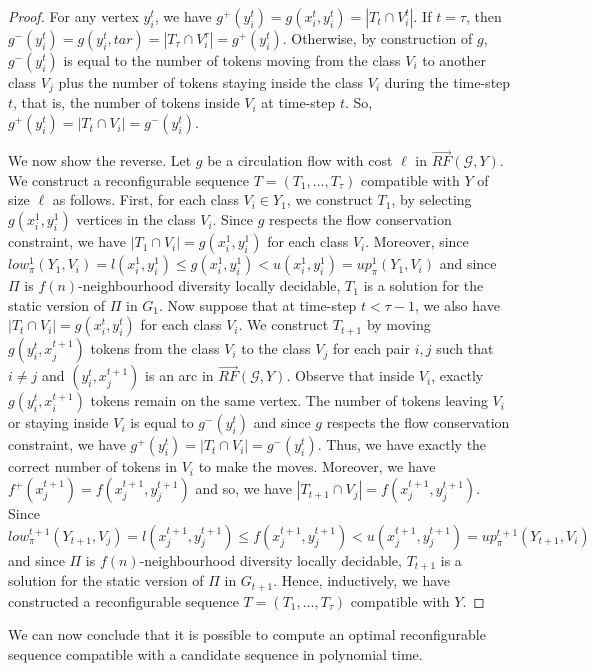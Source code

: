 \begin{proof}
    For any vertex $y^t_i$, we have $g^+(y^t_i) = g(x^t_i,y^t_i) = |T_t \cap V^t_i|$. If $t = \tau$, then $g^-(y^t_i) = g(y^t_i,tar) = |T_\tau \cap V^\tau_i| = g^+(y^t_i)$. Otherwise, by construction of $g$, $g^-(y^t_i)$ is equal to the number of tokens moving from the class $V_i$ to another class $V_j$ plus the number of tokens staying inside the class $V_i$ during the time-step $t$, that is, the number of tokens inside $V_i$ at time-step $t$. So, $g^+(y^t_i) = |T_t \cap V_i| = g^-(y^t_i)$.

    We now show the reverse.
    Let $g$ be a circulation flow with cost $\ell$ in $\overrightarrow{RF}(\mathcal{G},Y)$.
    We construct a reconfigurable sequence $T = (T_1,\dots,T_\tau)$ compatible with $Y$ of size $\ell$ as follows. First, for each class $V_i \in Y_1$, we construct $T_1$, by selecting $g(x^1_i,y^1_i)$ vertices in the class $V_i$. Since $g$ respects the flow conservation constraint, we have $|T_1 \cap V_i| = g(x^1_i,y^1_i)$ for each class $V_i$. Moreover, since $low^1_\pi(Y_1,V_i) = l(x^1_i,y^1_i) \leq g(x^1_i,y^1_i) < u(x^1_i,y^1_i) = up^1_\pi(Y_1,V_i)$ and since $\Pi$ is $f(n)$-neighbourhood diversity locally decidable, $T_1$ is a solution for the static version of $\Pi$ in $G_1$.
    Now suppose that at time-step $t<\tau-1$, we also have $|T_t \cap V_i| = g(x^t_i,y^t_i)$ for each class $V_i$. We construct $T_{t+1}$ by moving $g(y^t_i,x^{t+1}_j)$ tokens from the class $V_i$ to the class $V_j$ for each pair $i,j$ such that $i\neq j$ and $(y^t_i,x^{t+1}_j)$ is an arc in $\overrightarrow{RF}(\mathcal{G},Y)$. Observe that inside $V_i$, exactly $g(y^t_i,x^{t+1}_i)$ tokens remain on the same vertex. The number of tokens leaving $V_i$ or staying inside $V_i$ is equal to $g^-(y^t_i)$ and since $g$ respects the flow conservation constraint, we have $g^+(y^t_i)= |T_t \cap V_i| = g^-(y^t_i)$. Thus, we have exactly the correct number of tokens in $V_i$ to make the moves. Moreover, we have  $f^+(x^{t+1}_j)= f(x^{t+1}_j,y^{t+1}_j)$ and so, we have $|T_{t+1} \cap V_j| = f(x^{t+1}_j,y^{t+1}_j)$. Since $low^{t+1}_\pi(Y_{t+1},V_j) = l(x^{t+1}_j,y^{t+1}_j) \leq f(x^{t+1}_j,y^{t+1}_j) < u(x^{t+1}_j,y^{t+1}_j) = up^{t+1}_\pi(Y_{t+1},V_i)$ and since $\Pi$ is $f(n)$-neighbourhood diversity locally decidable, $T_{t+1}$ is a solution for the static version of $\Pi$ in $G_{t+1}$. Hence, inductively, we have constructed a reconfigurable sequence $T = (T_1,\dots,T_\tau)$ compatible with $Y$.
\end{proof}


We can now conclude that it is possible to compute an optimal reconfigurable sequence compatible with a candidate sequence in polynomial time.
 
